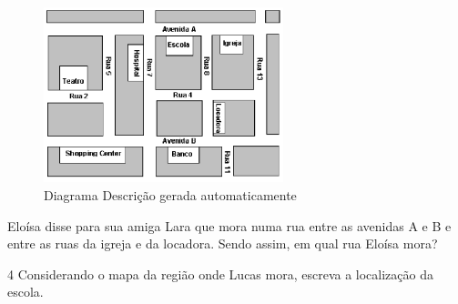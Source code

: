 \begin{escolha}
\begin{boxmedio}
\begin{boxmedio}
{\begin{boxpeq}
\begin{boxpeq}
{\begin{boxpeq}
\begin{boxmedio}
\begin{boxmedio}
\begin{boxpeq}
\begin{boxmedio}
\begin{boxpeq}
\begin{boxpeq}
\begin{boxpeq}
\begin{boxpeq}
\begin{boxmedio}
{\begin{boxmedio}
\begin{boxmedio}
\begin{boxpeq}
\begin{boxmedio}
\begin{boxpeq}
\begin{boxpeq}
\begin{boxpeq}
\begin{escolha}
{\begin{boxmedio}
\begin{boxpeq}
\begin{boxpeq}
\begin{boxpeq}
\begin{boxpeq}
\begin{boxpeq}
\begin{boxmedio}
\begin{boxpeq}
\begin{boxpeq}
\begin{boxpeq}
{\begin{boxpeq}
\begin{boxmedio}
\begin{boxpeq}
\begin{boxpeq}
\begin{boxpeq}
{\begin{boxpeq}
\begin{boxmedio}
{\begin{boxpeq}
\begin{boxpeq}
\begin{boxmedio}
\begin{boxmedio}
\begin{boxpeq}
\begin{boxpeq}
{\begin{boxpeq}
\begin{boxpeq}
\begin{boxpeq}
\begin{boxpeq}
\begin{boxpeq}
\begin{escolha}
\begin{escolha}
{\begin{boxmedio}
\begin{boxpeq}
\begin{q°}
\begin{boxmedio}
\begin{boxpeq}
\begin{boxpeq}
\begin{boxmedio}
\begin{boxmedio}
\begin{boxmedio}
\begin{figure}
\centering
\includegraphics[width=2.74306in,height=2.00374in]{./_SAEB_9_MAT/media/image200.png}
\caption{Diagrama Descrição gerada automaticamente}
\end{figure}


Eloísa disse para sua amiga Lara que mora numa rua entre as avenidas A e
B e entre as ruas da igreja e da locadora. Sendo assim, em qual rua Eloísa
mora?


\num{4} Considerando o mapa da região onde Lucas mora, escreva a localização
da escola.


\end{boxmedio}
\end{boxmedio}
\end{boxmedio}
\end{boxpeq}
\end{boxpeq}
\end{boxmedio}
\end{q°}
\end{boxpeq}
\end{boxmedio}}
\end{escolha}
\end{escolha}
\end{boxpeq}
\end{boxpeq}
\end{boxpeq}
\end{boxpeq}
\end{boxpeq}}
\end{boxpeq}
\end{boxpeq}
\end{boxmedio}
\end{boxmedio}
\end{boxpeq}
\end{boxpeq}}
\end{boxmedio}
\end{boxpeq}}
\end{boxpeq}
\end{boxpeq}
\end{boxpeq}
\end{boxmedio}
\end{boxpeq}}
\end{boxpeq}
\end{boxpeq}
\end{boxpeq}
\end{boxmedio}
\end{boxpeq}
\end{boxpeq}
\end{boxpeq}
\end{boxpeq}
\end{boxpeq}
\end{boxmedio}}
\end{escolha}
\end{boxpeq}
\end{boxpeq}
\end{boxpeq}
\end{boxmedio}
\end{boxpeq}
\end{boxmedio}
\end{boxmedio}}
\end{boxmedio}
\end{boxpeq}
\end{boxpeq}
\end{boxpeq}
\end{boxpeq}
\end{boxmedio}
\end{boxpeq}
\end{boxmedio}
\end{boxmedio}
\end{boxpeq}}
\end{boxpeq}
\end{boxpeq}}
\end{boxmedio}
\end{boxmedio}
\end{escolha}
